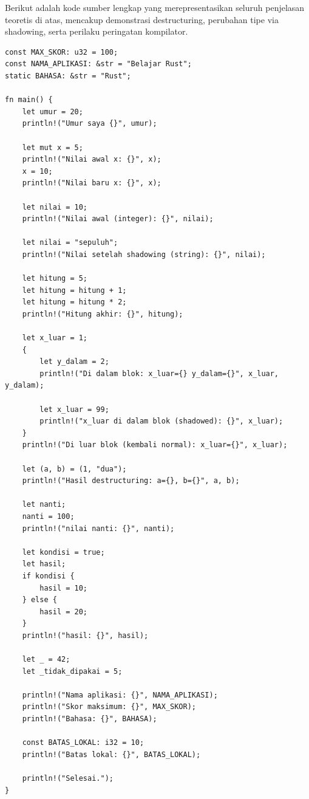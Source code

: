 \documentclass[11pt,a4paper]{article}
\begin{document}
Berikut adalah kode sumber lengkap yang merepresentasikan seluruh penjelasan teoretis di atas, mencakup demonstrasi destructuring, perubahan tipe via shadowing, serta perilaku peringatan kompilator.

\begin{lstlisting}
const MAX_SKOR: u32 = 100;
const NAMA_APLIKASI: &str = "Belajar Rust";
static BAHASA: &str = "Rust";

fn main() {
	let umur = 20;
	println!("Umur saya {}", umur);

	let mut x = 5;
	println!("Nilai awal x: {}", x);
	x = 10;
	println!("Nilai baru x: {}", x);

	let nilai = 10;
	println!("Nilai awal (integer): {}", nilai);

	let nilai = "sepuluh";
	println!("Nilai setelah shadowing (string): {}", nilai);

	let hitung = 5;
	let hitung = hitung + 1;
	let hitung = hitung * 2;
	println!("Hitung akhir: {}", hitung);

	let x_luar = 1;
	{
		let y_dalam = 2;
		println!("Di dalam blok: x_luar={} y_dalam={}", x_luar, y_dalam);

		let x_luar = 99;
		println!("x_luar di dalam blok (shadowed): {}", x_luar);
	}
	println!("Di luar blok (kembali normal): x_luar={}", x_luar);

	let (a, b) = (1, "dua");
	println!("Hasil destructuring: a={}, b={}", a, b);

	let nanti;
	nanti = 100;
	println!("nilai nanti: {}", nanti);

	let kondisi = true;
	let hasil;
	if kondisi {
		hasil = 10;
	} else {
		hasil = 20;
	}
	println!("hasil: {}", hasil);

	let _ = 42;
	let _tidak_dipakai = 5;

	println!("Nama aplikasi: {}", NAMA_APLIKASI);
	println!("Skor maksimum: {}", MAX_SKOR);
	println!("Bahasa: {}", BAHASA);

	const BATAS_LOKAL: i32 = 10;
	println!("Batas lokal: {}", BATAS_LOKAL);

	println!("Selesai.");
}
\end{lstlisting}
\end{document}
